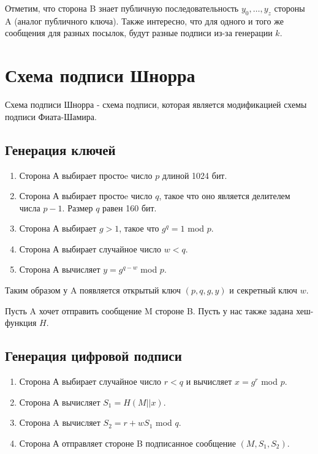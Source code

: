 \documentclass[colorthm]{./civarticle}
\begin{document}
Отметим, что сторона B знает публичную последовательность $y_0, \ldots, y_z$ стороны A (аналог публичного ключа). Также интересно, что для одного и того же сообщения для разных посылок, будут разные подписи из-за генерации $k$.

\section{Схема подписи Шнорра}
Схема подписи Шнорра - схема подписи, которая является модификацией схемы подписи Фиата-Шамира.

\subsection{Генерация ключей}

\begin{enumerate}
    \item Сторона А выбирает простоe число $p$ длиной 1024 бит.
    \item Сторона А выбирает простоe число $q$, такое что оно является делителем числа $p-1$. Размер $q$ равен 160 бит.
    \item Сторона А выбирает $g > 1$, такое что $g^q=1$ mod $p$.
    \item Сторона А выбирает случайное число $w < q$.
    \item Сторона А вычисляет $y = g^{q-w}$ mod $p$.
\end{enumerate}

Таким образом у A появляется открытый ключ $(p, q, g, y)$ и секретный ключ $w$.

Пусть A хочет отправить сообщение M стороне B. Пусть у нас также задана хеш-функция $H$.

\subsection{Генерация цифровой подписи}

\begin{enumerate}
    \item Сторона А выбирает случайное число $r < q$ и вычисляет $x = g^r$ mod $p$.
    \item Сторона А вычисляет $S_1=H(M||x)$.
    \item Сторона A вычисляет $S_2=r+wS_1$ mod $q$.
    \item Сторона А отправляет стороне B подписанное сообщение $(M, S_1, S_2)$.
\end{enumerate}
\end{document}
